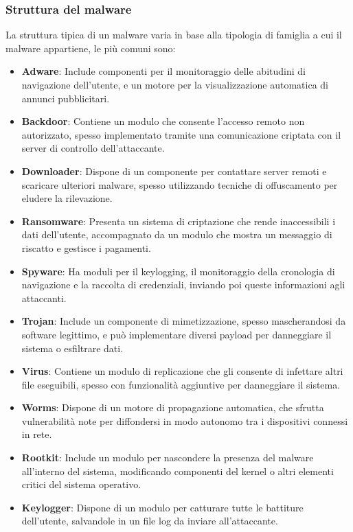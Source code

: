 \subsubsection{Struttura del malware}
La struttura tipica di un malware varia in base alla tipologia di famiglia a cui il malware appartiene, le più comuni sono:
\begin{itemize}
    \item \textbf{Adware}: Include componenti per il monitoraggio delle abitudini di navigazione dell'utente, e un motore per la visualizzazione automatica di annunci pubblicitari.
    \item \textbf{Backdoor}: Contiene un modulo che consente l'accesso remoto non autorizzato, spesso implementato tramite una comunicazione criptata con il server di controllo dell'attaccante.
    \item \textbf{Downloader}: Dispone di un componente per contattare server remoti e scaricare ulteriori malware, spesso utilizzando tecniche di offuscamento per eludere la rilevazione.
    \item \textbf{Ransomware}: Presenta un sistema di criptazione che rende inaccessibili i dati dell'utente, accompagnato da un modulo che mostra un messaggio di riscatto e gestisce i pagamenti.
    \item \textbf{Spyware}: Ha moduli per il keylogging, il monitoraggio della cronologia di navigazione e la raccolta di credenziali, inviando poi queste informazioni agli attaccanti.
    \item \textbf{Trojan}: Include un componente di mimetizzazione, spesso mascherandosi da software legittimo, e può implementare diversi payload per danneggiare il sistema o esfiltrare dati.
    \item \textbf{Virus}: Contiene un modulo di replicazione che gli consente di infettare altri file eseguibili, spesso con funzionalità aggiuntive per danneggiare il sistema.
    \item \textbf{Worms}: Dispone di un motore di propagazione automatica, che sfrutta vulnerabilità note per diffondersi in modo autonomo tra i dispositivi connessi in rete.
    \item \textbf{Rootkit}: Include un modulo per nascondere la presenza del malware all'interno del sistema, modificando componenti del kernel o altri elementi critici del sistema operativo.
    \item \textbf{Keylogger}: Dispone di un modulo per catturare tutte le battiture dell'utente, salvandole in un file log da inviare all'attaccante.

\end{itemize}
